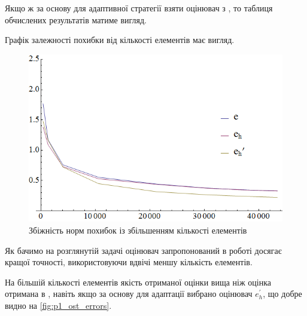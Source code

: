 %
Якщо ж за основу для адаптивної стратегії взяти оцінювач з \cite{OstShynAee11}, то таблиця обчислених результатів матиме вигляд.
%

Графік залежності похибки від кількості елементів має вигляд.

\begin{figure}[H]
	\centering
    \includegraphics[width=\textwidth]{problem1/ost/Plotnb}
    \caption{Збіжність норм похибок із збільшенням кількості елементів}
    \label{fig:p1_ost_errors}
\end{figure}

Як бачимо на розглянутій задачі оцінювач запропонований в роботі досягає кращої точності, використовуючи вдвічі меншу кількість елементів.

На більшій кількості елементів якість отриманої оцінки вища ніж оцінка отримана в \cite{OstShynAee11},
навіть якщо за основу для адаптації вибрано оцінювач $e_h^\prime$, що добре видно на \autoref{fig:p1_ost_errors}.
